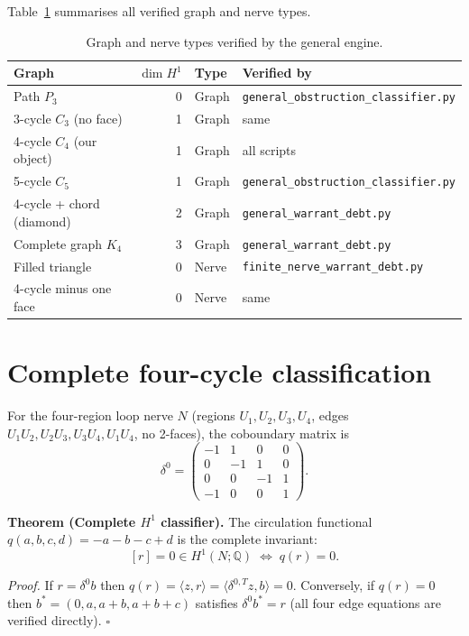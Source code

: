 \documentclass[11pt]{article}
\begin{document}
Table~\ref{tab:graph-types} summarises all verified graph and nerve types.

\begin{table}[h]
\centering
\begin{tabular}{l r l l}
\toprule
Graph & $\dim H^1$ & Type & Verified by \\
\midrule
Path $P_3$ & 0 & Graph & \texttt{general\_obstruction\_classifier.py} \\
3-cycle $C_3$ (no face) & 1 & Graph & same \\
4-cycle $C_4$ (our object) & 1 & Graph & all scripts \\
5-cycle $C_5$ & 1 & Graph & \texttt{general\_obstruction\_classifier.py} \\
4-cycle + chord (diamond) & 2 & Graph & \texttt{general\_warrant\_debt.py} \\
Complete graph $K_4$ & 3 & Graph & \texttt{general\_warrant\_debt.py} \\
Filled triangle & 0 & Nerve & \texttt{finite\_nerve\_warrant\_debt.py} \\
4-cycle minus one face & 0 & Nerve & same \\
\bottomrule
\end{tabular}
\caption{Graph and nerve types verified by the general engine.}
\label{tab:graph-types}
\end{table}

\section{Complete four-cycle classification}\label{thm:classifier}
For the four-region loop nerve $N$ (regions $U_1,U_2,U_3,U_4$, edges
$U_1U_2,U_2U_3,U_3U_4,U_1U_4$, no 2-faces), the coboundary matrix is
\[
\delta^0 =
\begin{pmatrix}
-1&1&0&0\\0&-1&1&0\\0&0&-1&1\\-1&0&0&1
\end{pmatrix}.
\]

\textbf{Theorem (Complete $H^1$ classifier).}
The circulation functional $q(a,b,c,d)=-a-b-c+d$ is the complete invariant:
\[
[r]=0\in H^1(N;\mathbb{Q})
\;\Longleftrightarrow\;
q(r)=0.
\]

\textit{Proof.}
If $r=\delta^0 b$ then $q(r)=\langle z,r\rangle=\langle\delta^{0,T}z,b\rangle=0$.
Conversely, if $q(r)=0$ then $b^*=(0,a,a+b,a+b+c)$ satisfies $\delta^0 b^*=r$
(all four edge equations are verified directly). $\square$
\end{document}
